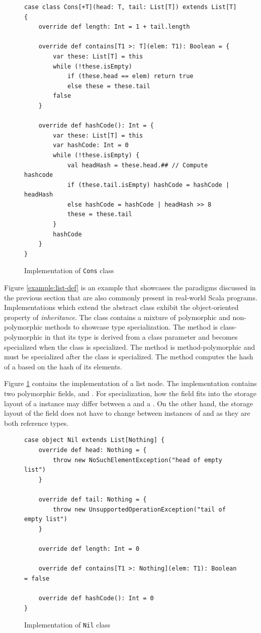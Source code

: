 \begin{figure}[!htb]
\begin{verbatim}
case class Cons[+T](head: T, tail: List[T]) extends List[T] {
	override def length: Int = 1 + tail.length
	
	override def contains[T1 >: T](elem: T1): Boolean = {
		var these: List[T] = this
		while (!these.isEmpty) 
			if (these.head == elem) return true
			else these = these.tail
		false
	}
			
	override def hashCode(): Int = {
		var these: List[T] = this
		var hashCode: Int = 0
		while (!these.isEmpty) {
			val headHash = these.head.## // Compute hashcode
			if (these.tail.isEmpty) hashCode = hashCode | headHash
			else hashCode = hashCode | headHash >> 8
			these = these.tail
		}
		hashCode
	}
}
\end{verbatim}
\caption{Implementation of \texttt{Cons} class}
\label{example:cons-impl}
\end{figure}

Figure \ref{example:list-def} is an example that showcases the paradigms discussed in the previous section that are also commonly present in real-world Scala programs.
Implementations which extend the abstract  class exhibit the object-oriented property of \textit{inheritance}.
The  class contains a mixture of polymorphic and non-polymorphic methods to showcase type specialization.
The  method is class-polymorphic in that its type is derived from a class parameter and becomes specialized when the class is specialized.
The  method is method-polymorphic and must be specialized after the class is specialized.
The  method computes the hash of a  based on the hash of its elements.

Figure \ref{example:cons-impl} contains the implementation of a list node.
The  implementation contains two polymorphic fields,  and .
For specialization, how the  field fits into the storage layout of a  instance may differ between a  and a .
On the other hand, the storage layout of the  field does not have to change between instances of  and  as they are both reference types.

\begin{figure}[!htb]
\begin{verbatim}
case object Nil extends List[Nothing] {
	override def head: Nothing = {
		throw new NoSuchElementException("head of empty list")
	}
	
	override def tail: Nothing = {
		throw new UnsupportedOperationException("tail of empty list")
	}
	
	override def length: Int = 0
		
	override def contains[T1 >: Nothing](elem: T1): Boolean = false
		
	override def hashCode(): Int = 0
}
\end{verbatim}
\caption{Implementation of \texttt{Nil} class}
\label{example:nil-impl}
\end{figure}

